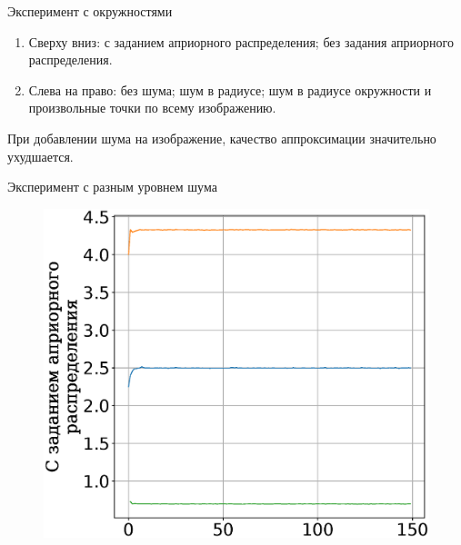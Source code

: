 \documentclass[10pt,pdf,hyperref={unicode}]{beamer}
\begin{document}
\begin{frame}{Эксперимент с окружностями}
\begin{enumerate}
\item Сверху вниз: с заданием априорного распределения; без задания априорного распределения.
\item Слева на право: без шума; шум в радиусе; шум в радиусе окружности и произвольные точки по всему изображению.
\end{enumerate}
При добавлении шума на изображение, качество аппроксимации значительно ухудшается.
\end{frame}

\begin{frame}{Эксперимент с разным уровнем шума}
\justifying

\begin{figure}[h]
\begin{minipage}{.27\textwidth}
      \includegraphics[width = 1.0\textwidth]{figures/910noise.eps}
\end{minipage}
\begin{minipage}{.27\textwidth}
\vspace{0.3mm}
\hspace{1.0mm}

\end{minipage}
\end{figure}
\end{frame}
\end{document}

